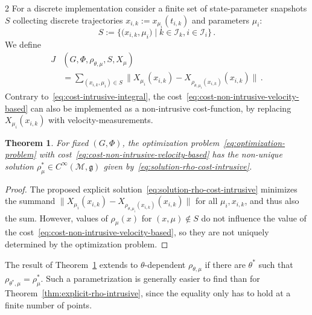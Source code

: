 \documentclass{article}
\newtheorem{theorem}{Theorem}[section]
\newtheorem{proof}{Proof}[theorem]
\newcommand{\M}{\mathcal{M}}                                %
\newcommand{\g}{\mathfrak{g}}                               %
\newcommand{\state}{x}
\begin{document}
\begin{multicols}{2}
For a discrete implementation consider a finite set of state-parameter snapshots $S$ collecting discrete trajectories $\state_{i,k} := \state_{\mu_i}(t_{i,k})$ and parameters $\mu_i$:
\begin{equation}\label{eq:snapshots-velocity-based}
    S:= \{\big(\state_{i,k}, \mu_i\big) \;|\; k \in \mathcal{I}_k, i \in \mathcal{I}_i \}\,.
\end{equation}
We define
\begin{align}\label{eq:cost-non-intrusive-velocity-based}
    J&(G,\Phi,\rho_{\theta,\mu},S,X_\mu) \\
    &= \sum_{(\state_{i,k}, \mu_i)\in S} \|X_{\mu_i}(\state_{i,k}) - X_{\rho_{\theta,\mu_i}(\state_{i,k})}(\state_{i,k}) \|\,. \nonumber
\end{align}
Contrary to~\eqref{eq:cost-intrusive-integral}, the cost~\eqref{eq:cost-non-intrusive-velocity-based} can also be implemented as a non-intrusive cost-function, by replacing $X_{\mu_i}(\state_{i,k})$ with velocity-measurements. 

\begin{theorem}\label{thm:explicit-rho-non-intrusive-velocity-based}
    For fixed $(G,\Phi)$, the optimization problem~\eqref{eq:optimization-problem} with cost~\eqref{eq:cost-non-intrusive-velocity-based} has the non-unique solution $\rho^*_{\mu} \in C^\infty(\M,\g)$ given by~\eqref{eq:solution-rho-cost-intrusive}.   
\end{theorem}
\begin{proof}
    The proposed explicit solution~\eqref{eq:solution-rho-cost-intrusive} minimizes the summand $\|X_{\mu_i}(\state_{i,k}) - X_{\rho_{\theta,\mu_i}(\state_{i,k})}(\state_{i,k}) \|$ for all $\mu_i, \state_{i,k}$, and thus also the sum. However, values of $\rho_\mu(\state)$ for $(\state,\mu) \notin S$ do not influence the value of the cost~\eqref{eq:cost-non-intrusive-velocity-based}, so they are not uniquely determined by the optimization problem.
\end{proof}
The result of Theorem~\ref{thm:explicit-rho-non-intrusive-velocity-based} extends to $\theta$-dependent $\rho_{\theta,\mu}$ if there are $\theta^*$ such that $\rho_{\theta^*,\mu}= \rho_\mu^*$. Such a parametrization is generally easier to find than for Theorem~\ref{thm:explicit-rho-intrusive}, since the equality only has to hold at a finite number of points.


\end{multicols}
\end{document}

